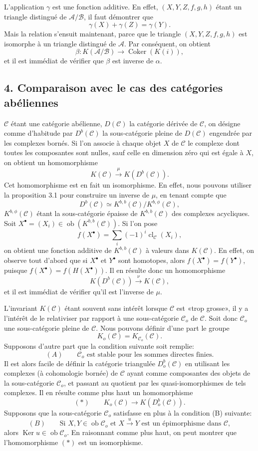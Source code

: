 \documentclass[11pt]{article}
\providecommand{\Ob}{\operatorname{ob}}
\providecommand{\cC}{\mathcal C}
\providecommand{\Ob}{\operatorname{ob}}
\providecommand{\cC}{\mathcal C}
\providecommand{\cA}{\mathcal A}
\providecommand{\cB}{\mathcal B}
\providecommand{\Ob}{\operatorname{Ob}}
\begin{document}
L'application $\gamma$ est une fonction additive. En effet, $(X,Y,Z,f,g,h)$ étant un triangle distingué de $\cA/\cB$, il faut démontrer que
\[
\gamma(X)+\gamma(Z)=\gamma(Y).
\]
Mais la relation s'ensuit maintenant, parce que le triangle $(X,Y,Z,f,g,h)$ est isomorphe à un triangle distingué de $\cA$. Par conséquent, on obtient
\[
\beta:K(\cA/\cB)\longrightarrow \operatorname{Coker}(K(i)),
\]
et il est immédiat de vérifier que $\beta$ est inverse de $\alpha$.

\subsection*{4. Comparaison avec le cas des catégories abéliennes}

$\cC$ étant une catégorie abélienne, $D(\cC)$ la catégorie dérivée de $\cC$, on désigne comme d'habitude par $D^b(\cC)$ la sous-catégorie pleine de $D(\cC)$ engendrée par les complexes bornés. Si l'on associe à chaque objet $X$ de $\cC$ le complexe dont toutes les composantes sont nulles, sauf celle en dimension zéro qui est égale à $X$, on obtient un homomorphisme
\[
K(\cC)\xrightarrow{\mu}K(D^b(\cC)).
\]
Cet homomorphisme est en fait un isomorphisme. En effet, nous pouvons utiliser la proposition 3.1 pour construire un inverse de $\mu$, en tenant compte que
\[
D^b(\cC)\simeq K^{b,b}(\cC)/K^{b,\phi}(\cC),
\]
$K^{b,\phi}(\cC)$ étant la sous-catégorie épaisse de $K^{b,b}(\cC)$ des complexes acycliques. Soit $X^\bullet=(X_i)\in\Ob(K^{b,b}(\cC))$. Si l'on pose
\[
f(X^\bullet)=\sum_i(-1)^i\operatorname{cl}_{\cC}(X_i),
\]
on obtient une fonction additive de $K^{b,b}(\cC)$ à valeurs dans $K(\cC)$. En effet, on observe tout d'abord que si $X^\bullet$ et $Y^\bullet$ sont homotopes, alors $f(X^\bullet)=f(Y^\bullet)$, puisque $f(X^\bullet)=f(H(X^\bullet))$. Il en résulte donc un homomorphisme
\[
K(D^b(\cC))\xrightarrow{\nu}K(\cC),
\]
et il est immédiat de vérifier qu'il est l'inverse de $\mu$.

L'invariant $K(\cC)$ étant souvent sans intérêt lorsque $\cC$ est «trop grosse», il y a l'intérêt de le relativiser par rapport à une sous-catégorie $\cC_o$ de $\cC$. Soit donc $\cC_o$ une sous-catégorie pleine de $\cC$. Nous pouvons définir d'une part le groupe
\[
K_o(\cC)=K_{\cC_o}(\cC).
\]
Supposons d'autre part que la condition suivante soit remplie:
\[
(A)\qquad \cC_o\text{ est stable pour les sommes directes finies.}
\]
Il est alors facile de définir la catégorie triangulée $D_o^b(\cC)$ en utilisant les complexes (à cohomologie bornée) de $\cC$ ayant comme composantes des objets de la sous-catégorie $\cC_o$, et passant au quotient par les quasi-isomorphismes de tels complexes. Il en résulte comme plus haut un homomorphisme
\[
(*)\qquad K_o(\cC)\longrightarrow K(D_o^b(\cC)).
\]
Supposons que la sous-catégorie $\cC_o$ satisfasse en plus à la condition (B) suivante:
\[
(B)\qquad
\text{Si }X,Y\in\Ob\cC_o\text{ et }X\xrightarrow{u}Y
\text{ est un épimorphisme dans }\cC,
\]
alors $\operatorname{Ker}u\in\Ob\cC_o$. En raisonnant comme plus haut, on peut montrer que l'homomorphisme $(*)$ est un isomorphisme.
\end{document}
